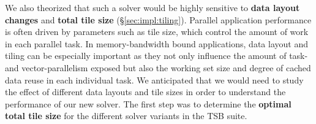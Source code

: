 \documentclass[10pt, conference, compsocconf]{IEEEtran}
\begin{document}
We also theorized that such a solver would be highly sensitive to
  \textbf{data layout changes} and
  \textbf{total tile size} (\S\ref{sec:impl:tiling}).
Parallel application performance is often driven by parameters such as 
  tile size, which control the amount of work in each parallel task.
In memory-bandwidth bound applications, data layout and tiling can be
  especially important as they not only influence the amount of task- and
  vector-parallelism exposed but also the working set size and degree of cached
  data reuse in each individual task.
We anticipated that we would need to study the effect of different data layouts
  and tile sizes in order to understand the performance of our new solver.
The first step was to determine the \textbf{optimal total tile size} for the 
  different solver variants in the TSB suite.
\end{document}
